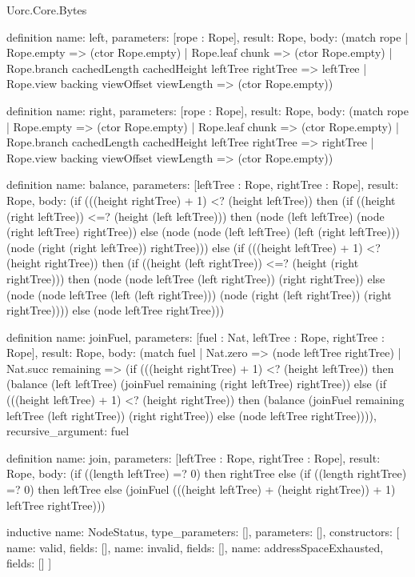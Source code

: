 \begin{lexlean}{Uorc.Core.Bytes}
\begin{semanticmodule}
definition{
  name: left,
  parameters: [rope : Rope],
  result: Rope,
  body: (match rope
    | Rope.empty => (ctor Rope.empty)
    | Rope.leaf chunk => (ctor Rope.empty)
    | Rope.branch cachedLength cachedHeight leftTree rightTree => leftTree
    | Rope.view backing viewOffset viewLength => (ctor Rope.empty))
}

definition{
  name: right,
  parameters: [rope : Rope],
  result: Rope,
  body: (match rope
    | Rope.empty => (ctor Rope.empty)
    | Rope.leaf chunk => (ctor Rope.empty)
    | Rope.branch cachedLength cachedHeight leftTree rightTree => rightTree
    | Rope.view backing viewOffset viewLength => (ctor Rope.empty))
}

definition{
  name: balance,
  parameters: [leftTree : Rope, rightTree : Rope],
  result: Rope,
  body: (if (((height rightTree) + 1) <? (height leftTree)) then (if ((height (right leftTree)) <=? (height (left leftTree))) then (node (left leftTree) (node (right leftTree) rightTree)) else (node (node (left leftTree) (left (right leftTree))) (node (right (right leftTree)) rightTree))) else (if (((height leftTree) + 1) <? (height rightTree)) then (if ((height (left rightTree)) <=? (height (right rightTree))) then (node (node leftTree (left rightTree)) (right rightTree)) else (node (node leftTree (left (left rightTree))) (node (right (left rightTree)) (right rightTree)))) else (node leftTree rightTree)))
}

definition{
  name: joinFuel,
  parameters: [fuel : Nat, leftTree : Rope, rightTree : Rope],
  result: Rope,
  body: (match fuel
    | Nat.zero => (node leftTree rightTree)
    | Nat.succ remaining => (if (((height rightTree) + 1) <? (height leftTree)) then (balance (left leftTree) (joinFuel remaining (right leftTree) rightTree)) else (if (((height leftTree) + 1) <? (height rightTree)) then (balance (joinFuel remaining leftTree (left rightTree)) (right rightTree)) else (node leftTree rightTree)))),
  recursive_argument: fuel
}

definition{
  name: join,
  parameters: [leftTree : Rope, rightTree : Rope],
  result: Rope,
  body: (if ((length leftTree) =? 0) then rightTree else (if ((length rightTree) =? 0) then leftTree else (joinFuel (((height leftTree) + (height rightTree)) + 1) leftTree rightTree)))
}

inductive{
  name: NodeStatus,
  type_parameters: [],
  parameters: [],
  constructors: [
    {name: valid, fields: []},
    {name: invalid, fields: []},
    {name: addressSpaceExhausted, fields: []}
  ]
}


\end{semanticmodule}
\end{lexlean}
